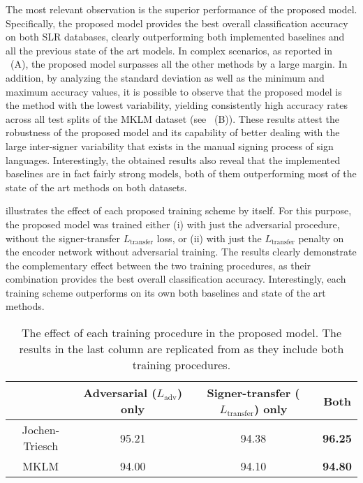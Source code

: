 The most relevant observation is the superior performance of the proposed model. Specifically, the proposed model provides the best overall classification accuracy on both SLR databases, clearly outperforming both implemented baselines and all the previous state of the art models. In complex scenarios, as reported in ~(A), the proposed model surpasses all the other methods by a large margin. In addition, by analyzing the standard deviation as well as the minimum and maximum accuracy values, it is possible to observe that the proposed model is the method with the lowest variability, yielding consistently high accuracy rates across all test splits of the MKLM dataset (see ~(B)). These results attest the robustness of the proposed model and its capability of better dealing with the large inter-signer variability that exists in the manual signing process of sign languages. Interestingly, the obtained results also reveal that the implemented baselines are in fact fairly strong models, both of them outperforming most of the state of the art methods on both datasets.

 illustrates the effect of each proposed training scheme by itself. For this purpose, the proposed model was trained either (i) with just the adversarial procedure, without the signer-transfer $L_{\text{transfer}}$ loss, or (ii) with just the $L_{\text{transfer}}$ penalty on the encoder network without adversarial training. The results clearly demonstrate the complementary effect between the two training procedures, as their combination provides the best overall classification accuracy. Interestingly, each training scheme outperforms on its own both baselines and state of the art methods.

\begin{table}[t]
    \centering
    \begin{small}
        \begin{tabular}{c|c c : c }
            & Adversarial ($L_{\text{adv}}$) only  & Signer-transfer ($L_{\text{transfer}}$) only & Both \\ \hline
            Jochen-Triesch                              & 95.21            & 94.38                & \textbf{96.25}        \\
            MKLM            & 94.00            & 94.10                & \textbf{94.80}        \\
        \end{tabular}
    \end{small}
    \caption{\centering The effect of each training procedure in the proposed model. The results in the last column are replicated from  as they include both training procedures.}
    \label{tab:loss_terms}
\end{table}

